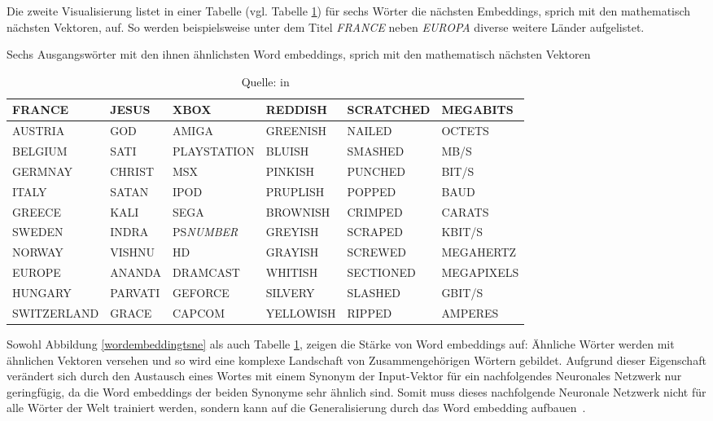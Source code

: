 Die zweite Visualisierung listet in einer Tabelle (vgl. Tabelle \ref{wordembeddingtable}) für sechs Wörter die nächsten Embeddings, sprich mit den mathematisch nächsten Vektoren, auf. So werden beispielsweise unter dem Titel \textit{FRANCE} neben \textit{EUROPA} diverse weitere Länder aufgelistet.
\begin{table}[h]
\centering
    \caption{Sechs Ausgangswörter mit den ihnen ähnlichsten Word embeddings, sprich mit den mathematisch nächsten Vektoren}
    \label{wordembeddingtable}
    \renewcommand{\arraystretch}{1.25}
    \setlength{\tabcolsep}{3pt}
    \small
    \begin{tabular}{ | l | l | l | l | l | l |}
    \hline
    \rowcolor{ccc} FRANCE & JESUS & XBOX & REDDISH & SCRATCHED & MEGABITS \\ \hline
    AUSTRIA & GOD & AMIGA & GREENISH & NAILED & OCTETS \\ \hline
    BELGIUM & SATI & PLAYSTATION & BLUISH & SMASHED & MB/S \\ \hline
    GERMNAY& CHRIST & MSX & PINKISH & PUNCHED & BIT/S \\ \hline
    ITALY & SATAN & IPOD & PRUPLISH & POPPED & BAUD \\ \hline
    GREECE & KALI & SEGA & BROWNISH & CRIMPED & CARATS \\ \hline
    SWEDEN & INDRA & PS\textit{NUMBER} & GREYISH & SCRAPED & KBIT/S \\ \hline
    NORWAY & VISHNU & HD & GRAYISH & SCREWED & MEGAHERTZ \\ \hline
    EUROPE & ANANDA & DRAMCAST & WHITISH & SECTIONED & MEGAPIXELS \\ \hline
    HUNGARY & PARVATI & GEFORCE & SILVERY & SLASHED & GBIT/S \\ \hline
    SWITZERLAND & GRACE & CAPCOM & YELLOWISH & RIPPED & AMPERES \\ \hline
    \end{tabular}
    \caption*{Quelle: \textcite{Collobert2011} in \textcite{Olah2014b}}
\end{table}

Sowohl Abbildung \ref{wordembeddingtsne} als auch Tabelle \ref{wordembeddingtable}, zeigen die Stärke von Word embeddings auf: Ähnliche Wörter werden mit ähnlichen Vektoren versehen und so wird eine komplexe Landschaft von Zusammengehörigen Wörtern gebildet. Aufgrund dieser Eigenschaft verändert sich durch den Austausch eines Wortes mit einem Synonym der Input-Vektor für ein nachfolgendes Neuronales Netzwerk nur geringfügig, da die Word embeddings der beiden Synonyme sehr ähnlich sind. Somit muss dieses nachfolgende Neuronale Netzwerk nicht für alle Wörter der Welt trainiert werden, sondern kann auf die Generalisierung durch das Word embedding aufbauen~\autocite{Olah2014b}.

